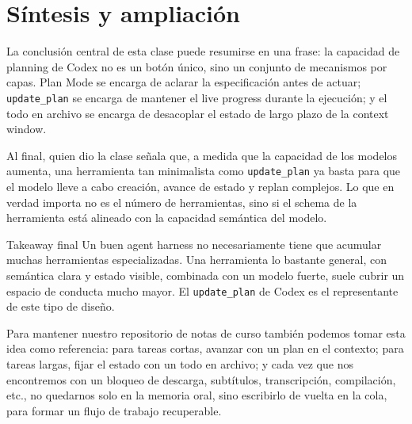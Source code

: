 \section{Síntesis y ampliación}

La conclusión central de esta clase puede resumirse en una frase: la capacidad de planning de Codex no es un botón único, sino un conjunto de mecanismos por capas. Plan Mode se encarga de aclarar la especificación antes de actuar; \texttt{update\_plan} se encarga de mantener el live progress durante la ejecución; y el todo en archivo se encarga de desacoplar el estado de largo plazo de la context window.

Al final, quien dio la clase señala que, a medida que la capacidad de los modelos aumenta, una herramienta tan minimalista como \texttt{update\_plan} ya basta para que el modelo lleve a cabo creación, avance de estado y replan complejos. Lo que en verdad importa no es el número de herramientas, sino si el schema de la herramienta está alineado con la capacidad semántica del modelo.

\begin{importantbox}{Takeaway final}
Un buen agent harness no necesariamente tiene que acumular muchas herramientas especializadas. Una herramienta lo bastante general, con semántica clara y estado visible, combinada con un modelo fuerte, suele cubrir un espacio de conducta mucho mayor. El \texttt{update\_plan} de Codex es el representante de este tipo de diseño.
\end{importantbox}

Para mantener nuestro repositorio de notas de curso también podemos tomar esta idea como referencia: para tareas cortas, avanzar con un plan en el contexto; para tareas largas, fijar el estado con un todo en archivo; y cada vez que nos encontremos con un bloqueo de descarga, subtítulos, transcripción, compilación, etc., no quedarnos solo en la memoria oral, sino escribirlo de vuelta en la cola, para formar un flujo de trabajo recuperable.


